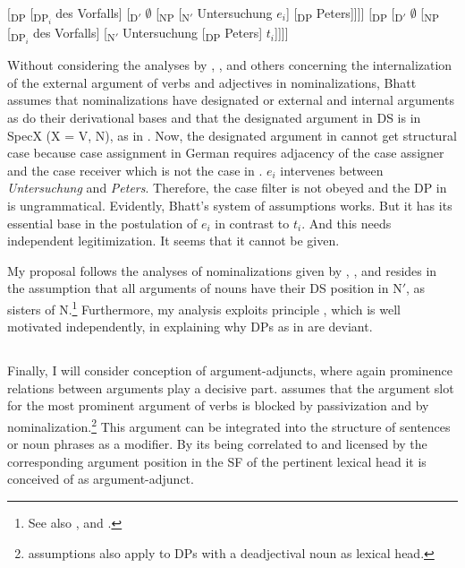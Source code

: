 \documentclass[output=paper,colorlinks,citecolor=brown]{langscibook}
\begin{document}
\ea \label{ex:zi91:67}
    \ea \label{ex:zi91:67a} $[$\textsubscript{DP} [\textsubscript{DP$_i$} des Vorfalls] [\textsubscript{D$'$} $\emptyset$ [\textsubscript{NP} [\textsubscript{N$'$} Untersuchung $e_i$] [\textsubscript{DP} Peters]]]]
    \ex \label{ex:zi91:67b} $[$\textsubscript{DP} [\textsubscript{D$'$} $\emptyset$ [\textsubscript{NP} [\textsubscript{DP$_i$} des Vorfalls] [\textsubscript{N$'$} Untersuchung [\textsubscript{DP} Peters] $t_i$]]]]
    \z
\z

\noindent Without considering the analyses by \citet{Williams81Argument-structure}, \citet{di1987definition}, \citet{Bierwisch89Event-nominalizations:} and others concerning the internalization of the external argument of verbs and adjectives in nominalizations, Bhatt assumes that nominalizations have designated or external and internal arguments as do their derivational bases and that the designated argument in DS is in SpecX (X = V, N), as in . Now, the designated argument in  cannot get structural case because case assignment in German requires adjacency of the case assigner and the case receiver which is not the case in . $e_{i}$ intervenes between \textit{Untersuchung} and \textit{Peters}. Therefore, the case filter  is not obeyed and the DP in  is ungrammatical. Evidently, Bhatt's system of assumptions works. But it has its essential base in the postulation of $e_{i}$ in contrast to $t_{i}$. And this needs independent legitimization. It seems that it cannot be given.

My proposal follows the analyses of nominalizations given by \citet{Williams81Argument-structure}, \citet{di1987definition}, \citet{Bierwisch89Event-nominalizations:} and resides in the assumption that all arguments of nouns have their DS position in N$'$, as sisters of N.\footnote{See also \citet{Huste89Zur-Syntax, Huste89Zur-Topologie}, \citet{Bischof91Sachverhaltsbezeichnungen-des} and \citet{Freytag90Die-syntaktische, Freytag91Sachverhaltsbezeichnungen-des}.} Furthermore, my analysis exploits principle , which is well motivated independently, in explaining why DPs as in  are deviant.

\subsection{} \label{sec:zi91:5.4}

Finally, I will consider  
conception of argument-adjuncts, where again prominence relations between arguments play a decisive part. \citet{Grimshaw88Adjuncts-and} assumes that the argument slot for the most prominent argument of verbs is blocked by passivization and by nominalization.\footnote{  assumptions also apply to DPs with a deadjectival noun as lexical head.} This argument can be integrated into the structure of sentences or noun phrases as a modifier. By its being correlated to and licensed by the corresponding argument position in the SF of the pertinent lexical head it is conceived of as argument-adjunct.
\end{document}
